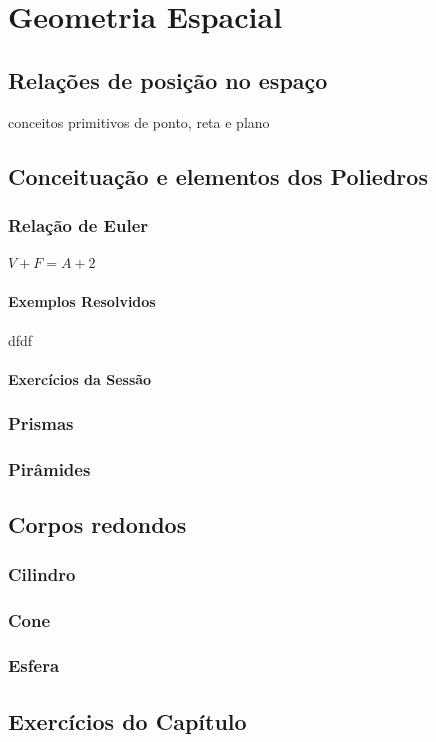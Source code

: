 \chapter{Geometria Espacial}

\section{Relações de posição no espaço}
	conceitos primitivos de ponto, reta e plano 
\section{Conceituação e elementos dos Poliedros}
 	\subsection{Relação de Euler}
 	$V+F=A+2$
 	\subsubsection{Exemplos Resolvidos}
 	dfdf
 	\subsubsection{Exercícios da Sessão}
 	\subsection{Prismas} 
 	\subsection{Pirâmides} 
\section{Corpos redondos}
 	\subsection{Cilindro}
 	\subsection{Cone}
 	\subsection{Esfera} 
\section{Exercícios do Capítulo}